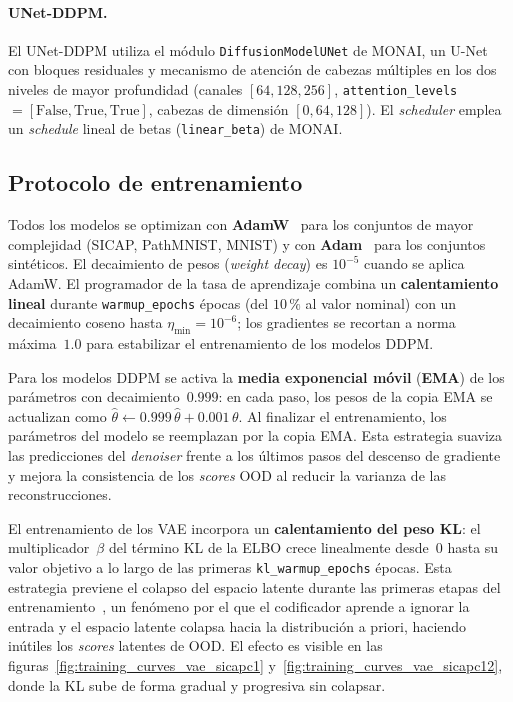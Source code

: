 \paragraph{UNet-DDPM.}
El UNet-DDPM utiliza el módulo \texttt{DiffusionModelUNet} de MONAI, un U-Net con
bloques residuales y mecanismo de atención de cabezas múltiples en los dos niveles de
mayor profundidad (canales $[64, 128, 256]$, \texttt{attention\_levels}~$= [\text{False},
\text{True}, \text{True}]$, cabezas de dimensión $[0, 64, 128]$). El \textit{scheduler}
emplea un \textit{schedule} lineal de betas (\texttt{linear\_beta}) de MONAI.

\subsection{Protocolo de entrenamiento}
\label{subsec:entrenamiento}

Todos los modelos se optimizan con \textbf{AdamW}~\cite{loshchilov_decoupled_2019}
para los conjuntos de mayor complejidad (SICAP, PathMNIST, MNIST) y con
\textbf{Adam}~\cite{kingma_adam_2015} para los conjuntos sintéticos. El decaimiento
de pesos (\textit{weight decay}) es $10^{-5}$ cuando se aplica AdamW. El
programador de la tasa de aprendizaje combina un \textbf{calentamiento lineal} durante
\texttt{warmup\_epochs} épocas (del $10\,\%$ al valor nominal) con un decaimiento
coseno hasta $\eta_{\min}{=}10^{-6}$; los gradientes se recortan a norma máxima~$1.0$
para estabilizar el entrenamiento de los modelos DDPM.

Para los modelos DDPM se activa la \textbf{media exponencial móvil} (\textbf{EMA})
de los parámetros con decaimiento~$0.999$: en cada paso, los pesos de la copia EMA
se actualizan como $\hat{\theta} \leftarrow 0.999\,\hat{\theta} + 0.001\,\theta$.
Al finalizar el entrenamiento, los parámetros del modelo se reemplazan por la copia
EMA. Esta estrategia suaviza las predicciones del \textit{denoiser} frente a los
últimos pasos del descenso de gradiente y mejora la consistencia de los \textit{scores}
OOD al reducir la varianza de las reconstrucciones.

El entrenamiento de los VAE incorpora un \textbf{calentamiento del peso KL}: el
multiplicador~$\beta$ del término KL de la ELBO crece linealmente desde~$0$ hasta su
valor objetivo a lo largo de las primeras \texttt{kl\_warmup\_epochs} épocas. Esta
estrategia previene el colapso del espacio latente durante las primeras etapas del
entrenamiento~\cite{bowman_generating_2016}, un fenómeno por el que el codificador
aprende a ignorar la entrada y el espacio latente colapsa hacia la distribución a priori,
haciendo inútiles los \textit{scores} latentes de OOD. El efecto es visible en las
figuras~\ref{fig:training_curves_vae_sicapc1} y~\ref{fig:training_curves_vae_sicapc12},
donde la KL sube de forma gradual y progresiva sin colapsar.

